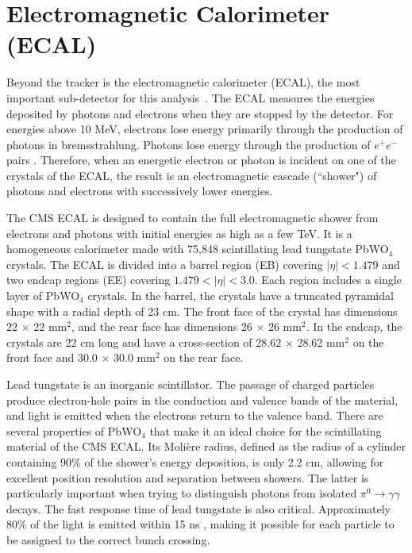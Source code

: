 

\section{Electromagnetic Calorimeter (ECAL)}
\label{sec:ECAL}

Beyond the tracker is the electromagnetic calorimeter (ECAL), the most important sub-detector for this analysis~\cite{ECAL_TDR,ECAL_TDRAddendum}. The ECAL measures the energies deposited by photons and electrons when they are stopped by the detector. For energies above 10 MeV, electrons lose energy primarily through the production of photons in bremsstrahlung. Photons lose energy through the production of $e^+e^-$ pairs \cite{Calo}. Therefore, when an energetic electron or photon is incident on one of the crystals of the ECAL, the result is an electromagnetic cascade (``shower") of photons and electrons with successively lower energies.

The CMS ECAL is designed to contain the full electromagnetic shower from electrons and photons with initial energies as high as a few TeV. It is a homogeneous calorimeter made with 75,848 scintillating lead tungstate PbWO$_4$ crystals. The ECAL is divided into a barrel region (EB) covering $|\eta| < 1.479$ and two endcap regions (EE) covering $1.479 < |\eta| < 3.0$.  Each region includes a single layer of PbWO$_4$ crystals. In the barrel, the crystals have a truncated pyramidal shape with a radial depth of 23 cm. The front face of the crystal has dimensions 22 $\times$ 22 mm$^2$, and the rear face has dimensions 26 $\times$ 26 mm$^2$. In the endcap, the crystals are 22 cm long and have a cross-section of 28.62 $\times$ 28.62 mm$^2$ on the front face and 30.0 $\times$ 30.0 mm$^2$ on the rear face. 

Lead tungstate is an inorganic scintillator. The passage of charged particles produce electron-hole pairs in the conduction and valence bands of the material, and light is emitted when the electrons return to the valence band. There are several properties of PbWO$_4$ that make it an ideal choice for the scintillating material of the CMS ECAL. Its Moli\`{e}re radius, defined as the radius of a cylinder containing 90\% of the shower's energy deposition, is only 2.2 cm, allowing for excellent position resolution and separation between showers. The latter is particularly important when trying to distinguish photons from isolated $\pi^0\rightarrow\gamma\gamma$ decays. The fast response time of lead tungstate is also critical. Approximately 80\% of the light is emitted within 15 ns \cite{Calo}, making it possible for each particle to be assigned to the correct bunch crossing. 

